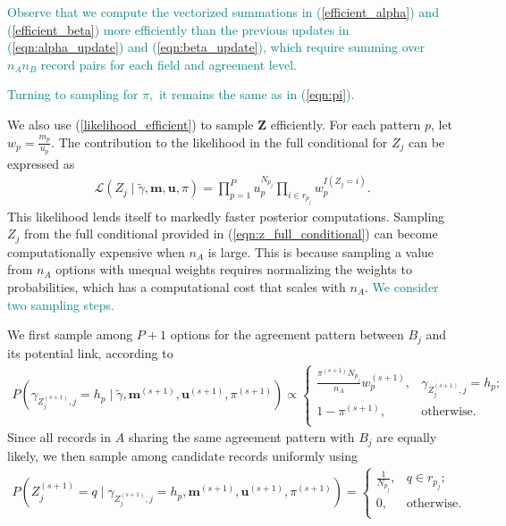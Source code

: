 \documentclass[ba]{imsart}
\begin{document}
\textcolor{teal}{Observe that we compute the vectorized summations in (\ref{efficient_alpha}) and (\ref{efficient_beta}) more efficiently than the previous updates in (\ref{eqn:alpha_update}) and (\ref{eqn:beta_update}), which require summing over $n_A n_B$ record pairs for each field and agreement level.}

\textcolor{teal}{Turning to sampling for $\pi,$ it remains the same as in (\ref{eqn:pi}). }

We also use (\ref{likelihood_efficient}) to sample $\bm{Z}$ efficiently. For each pattern $p$, let $w_p =\frac{m_p}{u_p}$.  The contribution to the likelihood in the full conditional for $Z_j$ can be expressed as
\begin{align}
	\mathcal{L}(Z_j\mid  \tilde{\gamma}, \bm{m}, \bm{u}, \pi) = \prod_{p=1}^P u_p^{N_{p_j}} \prod_{i \in r_{p_j}} w_p^{I(Z_j = i)}. \label{likelihood_efficient_z}
\end{align}
This likelihood lends itself to markedly faster posterior computations. Sampling $Z_j$ from the full conditional provided in (\ref{eqn:z_full_conditional}) can become computationally expensive when $n_A$ is large. This is because sampling a value from $n_A$ options with unequal weights requires normalizing the weights to probabilities, which has a computational cost that scales with $n_A$. \textcolor{teal}{We consider two sampling steps.}

We first sample among $P + 1$ options for the agreement pattern between $B_j$ and its potential link, according to
\begin{align}
	\label{eqn:gibbs1}
	P\left( \gamma_{Z_j^{(s+1)}, j} = h_p \mid \tilde{\gamma}, \bm{m}^{(s+1)}, \bm{u}^{(s+1)}, \pi^{(s+1)}\right) \propto
	\begin{cases} 
		\frac{\pi^{(s+1)}N_{p_j}}{n_A}  w_{p}^{(s+1)},  & \gamma_{Z_j^{(s+1)}, j} = h_p; \\
		1- \pi^{(s+1)} , &   \text{otherwise}. \\
	\end{cases}
\end{align}
Since all records in $A$ sharing the same agreement pattern with $B_j$ are equally likely, we then sample among candidate records uniformly using
\begin{align}
	\label{eqn:gibbs2}
	P\left(Z_j^{(s+1)} = q \mid \gamma_{Z_j^{(s+1)}, j} = h_p, \bm{m}^{(s+1)}, \bm{u}^{(s+1)}, \pi^{(s+1)} \right) = \begin{cases} 
		\frac{1}{N_{p_j}}, & q \in r_{p_j}; \\
		0, & \text{otherwise.} \\
	\end{cases}
\end{align} 
\end{document}
